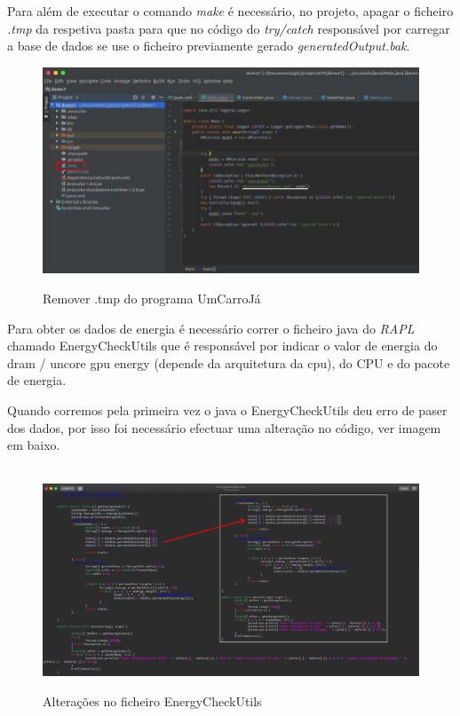 Para além de executar o comando \textit{make} é necessário, no projeto, apagar o ficheiro \textit{.tmp} da respetiva pasta para que no código do \textit{try/catch} responsável por carregar a base de dados se  use o ficheiro previamente gerado \textit{generatedOutput.bak}.


\begin{figure}[H]
    \centering
    \includegraphics[width=1.2\textwidth]{images/remove_tmp.png}
    \label{fig49}
    \caption{Remover .tmp do programa UmCarroJá}
\end{figure}

Para obter os dados de energia é necessário correr o ficheiro java do \textit{RAPL} chamado EnergyCheckUtils que é responsável por indicar o valor de energia do dram / uncore gpu energy (depende da arquitetura da cpu), do CPU e do pacote de energia.

Quando corremos pela primeira vez o java o EnergyCheckUtils deu erro de paser dos dados, por isso foi necessário efectuar uma alteração no código, ver imagem em baixo.

\begin{figure}[H]
    \hbox{\hspace{-8em} \includegraphics[width=1.5\textwidth]{images/energycheckutils.png}}
    \label{fig50}
    \caption{Alterações no ficheiro EnergyCheckUtils}
\end{figure}


